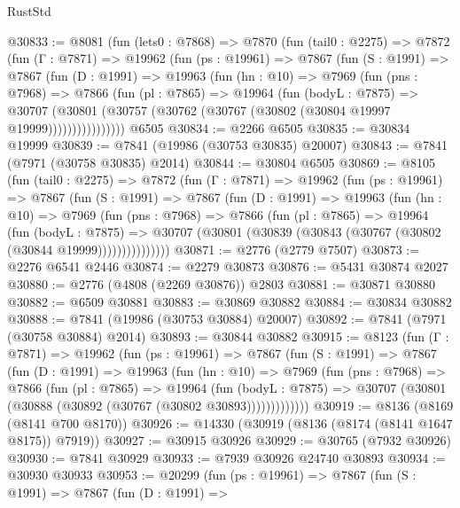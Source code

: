 \begin{lexlean}{RustStd}
\begin{coremodule}
@30833 := @8081
    (fun (lets0 : @7868) =>
    @7870
      (fun (tail0 : @2275) =>
      @7872
        (fun (Γ : @7871) =>
        @19962
          (fun (ps : @19961) =>
          @7867
            (fun (S : @1991) =>
            @7867
              (fun (D : @1991) =>
              @19963
                (fun (hn : @10) =>
                @7969
                  (fun (pns : @7968) =>
                  @7866
                    (fun (pl : @7865) =>
                    @19964
                      (fun (bodyL : @7875) =>
                      @30707
                        (@30801
                          (@30757 (@30762 (@30767 (@30802 (@30804 @19997 @19999))))))))))))))))
    @6505
@30834 := @2266 @6505
@30835 := @30834 @19999
@30839 := @7841 (@19986 (@30753 @30835) @20007)
@30843 := @7841 (@7971 (@30758 @30835) @2014)
@30844 := @30804 @6505
@30869 := @8105
    (fun (tail0 : @2275) =>
    @7872
      (fun (Γ : @7871) =>
      @19962
        (fun (ps : @19961) =>
        @7867
          (fun (S : @1991) =>
          @7867
            (fun (D : @1991) =>
            @19963
              (fun (hn : @10) =>
              @7969
                (fun (pns : @7968) =>
                @7866
                  (fun (pl : @7865) =>
                  @19964
                    (fun (bodyL : @7875) =>
                    @30707 (@30801 (@30839 (@30843 (@30767 (@30802 (@30844 @19999)))))))))))))))
@30871 := @2776 (@2779 @7507)
@30873 := @2276 @6541 @2446
@30874 := @2279 @30873
@30876 := @5431 @30874 @2027
@30880 := @2776 (@4808 (@2269 @30876)) @2803
@30881 := @30871 @30880
@30882 := @6509 @30881
@30883 := @30869 @30882
@30884 := @30834 @30882
@30888 := @7841 (@19986 (@30753 @30884) @20007)
@30892 := @7841 (@7971 (@30758 @30884) @2014)
@30893 := @30844 @30882
@30915 := @8123
    (fun (Γ : @7871) =>
    @19962
      (fun (ps : @19961) =>
      @7867
        (fun (S : @1991) =>
        @7867
          (fun (D : @1991) =>
          @19963
            (fun (hn : @10) =>
            @7969
              (fun (pns : @7968) =>
              @7866
                (fun (pl : @7865) =>
                @19964
                  (fun (bodyL : @7875) =>
                  @30707 (@30801 (@30888 (@30892 (@30767 (@30802 @30893)))))))))))))
@30919 := @8136 (@8169 (@8141 @700 @8170))
@30926 := @14330 (@30919 (@8136 (@8174 (@8141 @1647 @8175)) @7919))
@30927 := @30915 @30926
@30929 := @30765 (@7932 @30926)
@30930 := @7841 @30929
@30933 := @7939 @30926 @24740 @30893
@30934 := @30930 @30933
@30953 := @20299
    (fun (ps : @19961) =>
    @7867
      (fun (S : @1991) =>
      @7867
        (fun (D : @1991) =>

\end{coremodule}
\end{lexlean}

